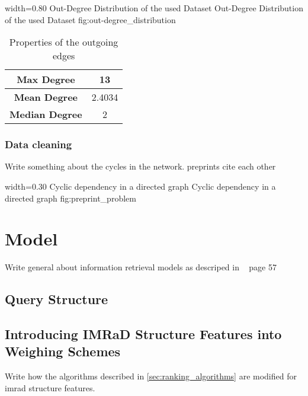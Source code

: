       {width=0.80\textwidth}
      {Out-Degree Distribution of the used Dataset}
      {Out-Degree Distribution of the used Dataset}
      {fig:out-degree_distribution}

\begin{table}
  \centering
  \begin{tabular}{ | c | c | }
    \hline
    \textbf{Max Degree} & 13 \\ \hline
    \textbf{Mean Degree} & 2.4034 \\ \hline
    \textbf{Median Degree} & 2 \\ \hline
  \end{tabular}
  \caption[Properties of the outgoing edges in the used dataset]{Properties of the outgoing edges}
  \label{tbl:properties_outgoing_edges}
\end{table}

\subsubsection{Data cleaning}
\label{subsubsec:data_cleaning}
Write something about the cycles in the network. preprints cite each other

      {width=0.30\textwidth}
      {Cyclic dependency in a directed graph}
      {Cyclic dependency in a directed graph}
      {fig:preprint_problem}

\section{Model}
\label{sec:model}

Write general about information retrieval models as descriped in ~\cite{ModernInvormationRetrieval1999} page 57

\subsection{Query Structure}
\subsection{Introducing IMRaD Structure Features into Weighing Schemes}

Write how the algorithms described in \cref{sec:ranking_algorithms} are modified for imrad structure features.
